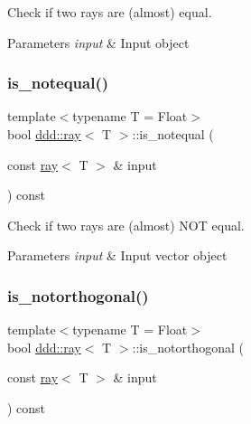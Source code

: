 Check if two rays are (almost) equal. 


\begin{DoxyParams}{Parameters}
{\em input} & Input object \\
\hline
\end{DoxyParams}
\mbox{\label{classddd_1_1ray_a905bb4921312cd23ee918d90a1e7f6e8}} 
\subsubsection{\texorpdfstring{is\+\_\+notequal()}{is\_notequal()}}
{\footnotesize\ttfamily template$<$typename T = Float$>$ \\
bool \hyperlink{classddd_1_1ray}{ddd\+::ray}$<$ T $>$\+::is\+\_\+notequal (\begin{DoxyParamCaption}\item[{const \hyperlink{classddd_1_1ray}{ray}$<$ T $>$ \&}]{input }\end{DoxyParamCaption}) const\hspace{0.3cm}{\ttfamily [inline]}}



Check if two rays are (almost) N\+OT equal. 


\begin{DoxyParams}{Parameters}
{\em input} & Input vector object \\
\hline
\end{DoxyParams}
\mbox{\label{classddd_1_1ray_aa0c53861b95ff86c12e9c0bcac935080}} 
\subsubsection{\texorpdfstring{is\+\_\+notorthogonal()}{is\_notorthogonal()}}
{\footnotesize\ttfamily template$<$typename T = Float$>$ \\
bool \hyperlink{classddd_1_1ray}{ddd\+::ray}$<$ T $>$\+::is\+\_\+notorthogonal (\begin{DoxyParamCaption}\item[{const \hyperlink{classddd_1_1ray}{ray}$<$ T $>$ \&}]{input }\end{DoxyParamCaption}) const\hspace{0.3cm}{\ttfamily [inline]}}



